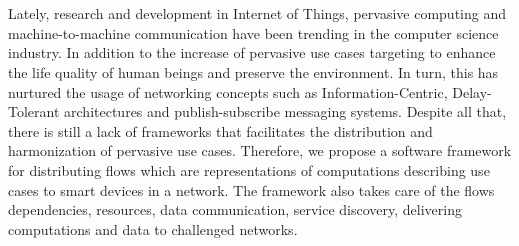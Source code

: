 \chapter{\abstractname}
Lately, research and development in Internet of Things, pervasive computing and machine-to-machine communication have been trending  in the computer science industry. In addition to the increase of pervasive use cases targeting to enhance the  life quality of human beings and preserve the environment. In turn, this has nurtured  the usage of networking concepts such as Information-Centric, Delay-Tolerant architectures and publish-subscribe messaging systems.  Despite all that, there is still a lack of frameworks that facilitates the distribution and harmonization of pervasive use cases. Therefore, we propose a software framework for distributing flows which are representations of computations describing use cases to smart devices in a network. The framework also takes care of the flows dependencies, resources, data communication, service discovery, delivering computations and data to challenged networks.


